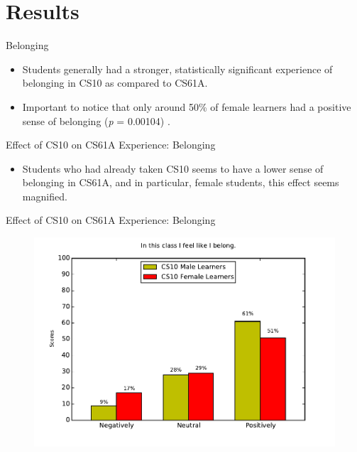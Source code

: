 \documentclass{beamer}                  %
\begin{document}
\section{Results}
\begin{frame}{Belonging}
\begin{itemize}
\item Students generally had a stronger, statistically significant experience of belonging in CS10 as compared to CS61A. 
\item Important to notice that only around 50\% of female learners had a positive sense of belonging (\emph{p} = 0.00104) . 
\end{itemize}
\end{frame}

\begin{frame}{Effect of CS10 on CS61A Experience: Belonging}
  \begin{itemize}
  \item Students who had already taken CS10 seems to have a lower sense of belonging in CS61A, and in particular, female students, this effect seems magnified.
  \end{itemize}
\end{frame}
    
\begin{frame}{Effect of CS10 on CS61A Experience: Belonging}

  \begin{figure}[!htbp]
      \centering 
      \includegraphics[width=1\textwidth]{blg_1_worstCaseScenario_cs10}
  \end{figure}

\end{frame}
\end{document}
